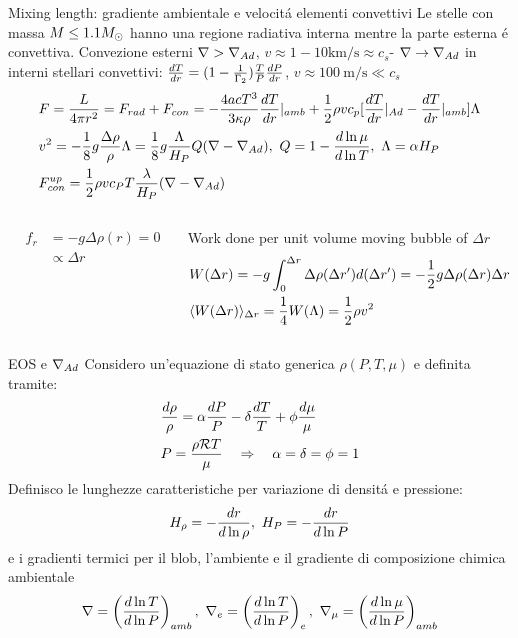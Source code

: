 \begin{frame}{Mixing length: gradiente ambientale e velocit\'a elementi convettivi}
Le stelle con massa $M\leq1.1\msun{}$ hanno una regione radiativa interna mentre la parte esterna \'e convettiva. Convezione esterni $\nabla>\nad$, $v\approx1-10\si{\kilo\meter\per\second}\approx c_s$- $\nabla\to\nad{}$ in interni stellari convettivi: $\TDy{r}{T}=(1-\frac{1}{\Gamma_2})\frac{T}{P}\TDy{r}{P}$, $v\approx\SI{100}{\meter\per\second}\ll c_s$
	\begin{align*}
&F=\frac{L}{4\pi r^2}=F_{rad}+F_{con}=-\frac{4acT^3}{3\kappa\rho}\TDy{r}{T}|_{amb}+\frac{1}{2}\rho vc_p[\TDy{r}{T}|_{Ad}-\TDy{r}{T}|_{amb}]\Lambda\\
&v^2=-\frac{1}{8}g\frac{\Delta\rho}{\rho}\Lambda=\frac{1}{8}g\frac{\Lambda}{H_P}Q(\nabla-\nad),\ Q=1-\TDly{T}{\mu},\ \Lambda=\alpha H_P\\
&F_{con}^{up}=\frac{1}{2}\rho vc_PT\frac{\lambda}{H_P}(\nabla-\nad{})
\end{align*} 
\begin{columns}[T]
\begin{column}{0.3\textwidth}
\begin{align*}
&f_r&=-g\Delta\rho(r)=0\tag{r}\\
&&\propto\Delta r
\end{align*} 
\end{column}
\begin{column}{0.7\textwidth}
Work done per unit volume moving bubble of $\Delta r$
\begin{align*}
&W(\Delta r)=-g\int_0^{\Delta r}\Delta\rho(\Delta r')d(\Delta r')=-\frac{1}{2}g\Delta\rho(\Delta r)\Delta r\\
&\exv{W(\Delta r)}_{\Delta r}=\frac{1}{4}W(\Lambda)=\frac{1}{2}\rho v^2
\end{align*} 
\end{column}\end{columns}
\end{frame}

\begin{wordonframe}{EOS e $\nad{}$}
Considero un'equazione di stato generica $\rho(P,T,\mu)$ e definita tramite:
\begin{align*}
&\frac{d\rho}{\rho}=\alpha\frac{dP}{P}-\delta\frac{dT}{T}+\phi\frac{d\mu}{\mu}\\
&P=\frac{\rho\gasconstant{}T}{\mu}\quad\Rightarrow\quad\alpha=\delta=\phi=1
\end{align*}
Definisco le lunghezze caratteristiche per variazione di densit\'a e pressione:
\begin{equation*}
\densityscale{}=-\frac{dr}{d\ln{\rho}},\ H_P=-\frac{dr}{d\ln{P}}
\end{equation*}
e i gradienti termici per il blob, l'ambiente e il gradiente di composizione chimica ambientale
\begin{equation*}
\nabla=\Dcvar{\TDly{P}{T}}{amb},\ \nabla_e=\Dcvar{\TDly{P}{T}}{e},\ \nmu{}=\Dcvar{\TDly{P}{\mu}}{amb}
\end{equation*}
\end{wordonframe}

